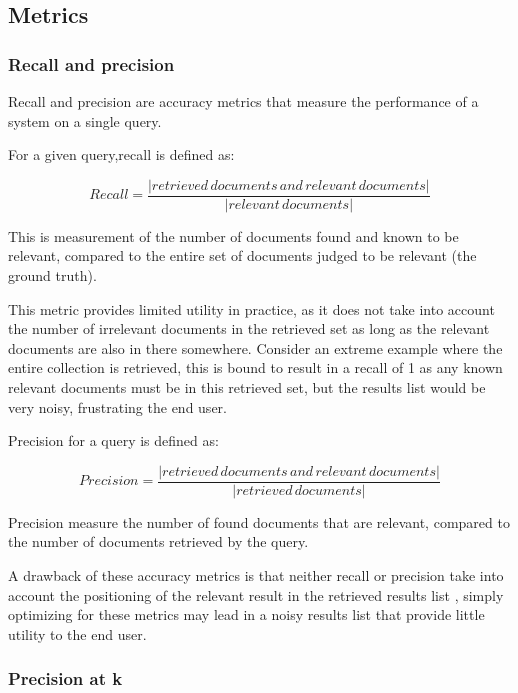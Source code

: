 \subsection{Metrics}


\subsubsection{Recall and precision}

Recall and precision are accuracy metrics that measure the performance of a system on a single query. 

For a given query,recall is defined as:

\begin{equation}
Recall = \frac{|retrieved\,documents \, and\,relevant\,documents|}{|relevant\,documents|}
\end{equation}

This is measurement of the number of documents found and known to be relevant, compared to the entire set of documents judged to be relevant (the ground truth).

This metric provides limited utility in practice, as it does not take into account the number of irrelevant documents in the retrieved set as long as the relevant documents are also in there somewhere. Consider an extreme example where the entire collection is retrieved, this is bound to result in a recall of 1 as any known relevant documents must be in this retrieved set, but the results list would be very noisy, frustrating the end user. 

Precision for a query is defined as:

\begin{equation}
Precision = \frac{|retrieved\,documents \, and\,relevant\,documents|}{|retrieved\,documents|}
\end{equation}

Precision measure the number of found documents that are relevant, compared to the number of documents retrieved by the query. 

A drawback of these accuracy metrics is that neither recall or precision take into account the positioning of the relevant result in the retrieved results list , simply optimizing for these metrics may lead in a noisy results list that provide little utility to the end user.


\subsubsection{Precision at k}

